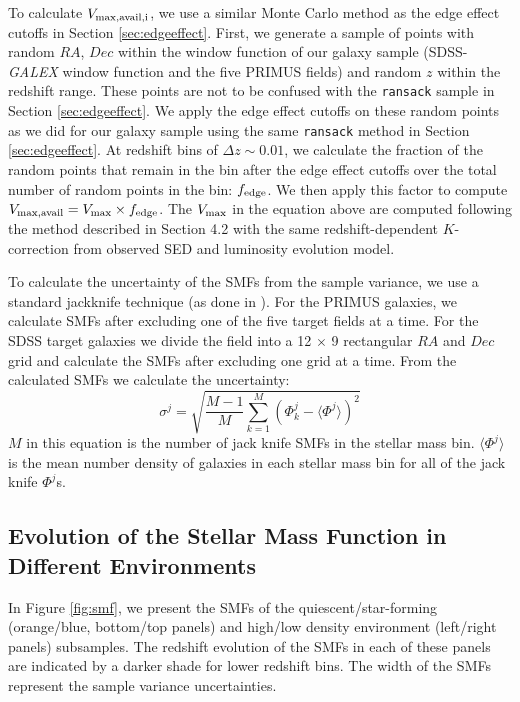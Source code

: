 \documentclass{emulateapj}
\begin{document}
To calculate $V_{\rm{max,avail},i}$, we use a similar Monte Carlo method as the edge effect cutoffs in Section \ref{sec:edgeeffect}. First, we generate a sample of points with random $RA$, $Dec$ within the window function of our galaxy sample (SDSS-{\em GALEX} window function and the five PRIMUS fields) and random $z$ within the redshift range. These points are not to be confused with the \texttt{ransack} sample in Section \ref{sec:edgeeffect}. We apply the edge effect cutoffs on these random points as we did for our galaxy sample using the same \texttt{ransack} method in Section \ref{sec:edgeeffect}. At redshift bins of $\Delta z \sim 0.01$, we calculate the fraction of the random points that remain in the bin after the edge effect cutoffs over the total number of random points in the bin: $f_{\rm{edge}}$. We then apply this factor to compute $V_{\rm{max,avail}} = V_{\rm{max}} \times f_{\rm{edge}}$. The $V_{\rm{max}}$ in the equation above are computed following the method described in \cite{Moustakas:2013aa} Section 4.2 with the same redshift-dependent $K$-correction from observed SED and luminosity evolution model.

To calculate the uncertainty of the SMFs from the sample variance, we use a standard jackknife technique (as done in \cite{Moustakas:2013aa}). For the PRIMUS galaxies, we calculate SMFs after excluding one of the five target fields at a time. For the SDSS target galaxies we divide the field into a 12 $\times$ 9 rectangular $RA$ and $Dec$ grid and calculate the SMFs after excluding one grid at a time. From the calculated SMFs we calculate the uncertainty: 
\begin{equation}
\sigma^j = \sqrt{\frac{M-1}{M} \sum\limits_{k=1}^{M} (\Phi^j_k - \langle \Phi^j \rangle)^2}
\end{equation} 
$M$ in this equation is the number of jack knife SMFs in the stellar mass bin. $\langle \Phi^j \rangle$ is the mean number density of galaxies in each stellar mass bin for all of the jack knife $\Phi^j$s. 

\subsection{Evolution of the Stellar Mass Function in Different Environments} \label{sec:smfevol}
In Figure \ref{fig:smf}, we present the SMFs of the quiescent/star-forming (orange/blue, bottom/top panels) and high/low density environment (left/right panels) subsamples. The redshift evolution of the SMFs in each of these panels are indicated by a darker shade for lower redshift bins. The width of the SMFs represent the sample variance uncertainties.
\end{document}
